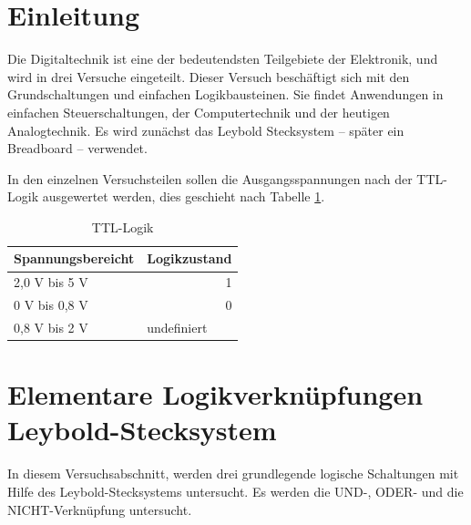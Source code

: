 \documentclass[12pt,a4paper]{article}
\begin{document}
\newpage
\tableofcontents
\newpage
\section{Einleitung}
Die Digitaltechnik ist eine der bedeutendsten Teilgebiete der Elektronik, und wird in drei Versuche eingeteilt. Dieser Versuch beschäftigt sich mit den Grundschaltungen und einfachen Logikbausteinen. Sie findet Anwendungen in einfachen Steuerschaltungen, der Computertechnik und der heutigen Analogtechnik. Es wird zunächst das Leybold Stecksystem -- später ein Breadboard -- verwendet. 

In den einzelnen Versuchsteilen sollen die Ausgangsspannungen nach der TTL-Logik ausgewertet werden, dies geschieht nach Tabelle \ref{tab:ttl}.

\begin{table}[H]
\centering
\begin{tabular}{|l|l|}
\hline
Spannungsbereicht & Logikzustand \\ \hline
2,0 V bis 5 V & \multicolumn{1}{r|}{1} \\ \hline
0 V bis 0,8 V & \multicolumn{1}{r|}{0} \\ \hline
0,8 V bis 2 V & undefiniert \\ \hline
\end{tabular}
\caption{TTL-Logik}
\label{tab:ttl}
\end{table}


\section{Elementare Logikverknüpfungen Leybold-Stecksystem}

In diesem Versuchsabschnitt, werden drei grundlegende logische Schaltungen mit Hilfe des Leybold-Stecksystems untersucht. Es werden die UND-, ODER- und die NICHT-Verknüpfung untersucht.
\end{document}
